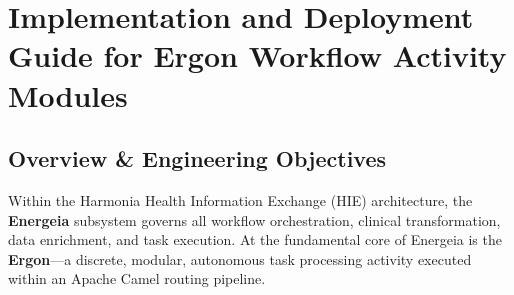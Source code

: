 
\chapter{Implementation and Deployment Guide for Ergon Workflow Activity Modules}
\label{app:ergon_modules}

\section{Overview \& Engineering Objectives}
\label{sec:ergon_guide_overview}

Within the Harmonia Health Information Exchange (HIE) architecture, the \textbf{Energeia} subsystem governs all workflow orchestration, clinical transformation, data enrichment, and task execution. At the fundamental core of Energeia is the \textbf{Ergon}---a discrete, modular, autonomous task processing activity executed within an Apache Camel routing pipeline.

